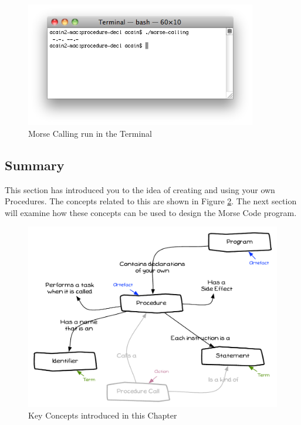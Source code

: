 \begin{figure}[h]
   \centering
   \includegraphics[width=0.9\textwidth]{./topics/procedure-decl/images/MorseCalling} 
   \caption{Morse Calling run in the Terminal}
   \label{fig:procedure-decl-morse_calling}
\end{figure}





\clearpage
\subsection{Summary} %
\label{sub:procedure-decl_summary}

This section has introduced you to the idea of creating and using your own Procedures. The concepts related to this are shown in Figure \ref{fig:procedure-decl-summary}. The next section will examine how these concepts can be used to design the Morse Code program.

\begin{figure}[h]
   \centering
   \includegraphics[width=\textwidth]{./topics/procedure-decl/diagrams/Summary} 
   \caption[Chapter Concepts]{Key Concepts introduced in this Chapter}
   \label{fig:procedure-decl-summary}
\end{figure}

